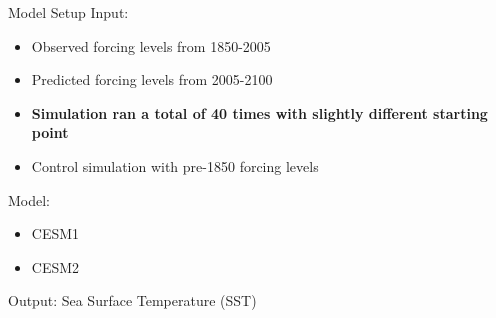 \documentclass{beamer}
\begin{document}
\begin{frame}{Model Setup}
  Input:
  \begin{itemize}
  \item Observed forcing levels from 1850-2005
  \item Predicted forcing levels from 2005-2100
  \item \textbf{Simulation ran a total of 40 times with slightly different starting point}
  \item Control simulation with pre-1850 forcing levels
  \end{itemize}
  Model:
  \begin{itemize}
  \item CESM1 \citep{kay2015community}
  \item CESM2 \citep{danabasoglu2020community}
  \end{itemize}
  Output: Sea Surface Temperature (SST)
\end{frame}
\end{document}
